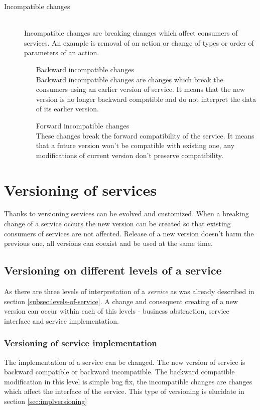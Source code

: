 \begin{description}
  \item[Incompatible changes] \hfill \\
  Incompatible changes are breaking changes which affect consumers of services. An example is removal of an action or change of types or order of parameters of an action.
  \begin{enumerate} 
    \item[Backward incompatible changes]  \hfill \\
    Backward incompatible changes are changes which break the consumers using an earlier version of service. It means that the new version is no longer backward compatible and do not interpret the data of its earlier version.
    \item[Forward incompatible changes] \hfill \\
    These changes break the forward compatibility of the service. It means that a future version won't be compatible with existing one, any modifications of current version don't preserve compatibility.
  \end{enumerate}
\end{description}

\section{Versioning of services}
\label{sec:verioningservices}
Thanks to versioning services can be evolved and customized. When a breaking change of a service occurs the new version can be created so that existing consumers of services are not affected. Release of a new version doesn't harm the previous one, all versions can coexist and be used at the same time. 

\subsection{Versioning on different levels of a service}
As there are three levels of interpretation of a \emph{service} as was already described in section \ref{subsec:levels-of-service}. A change and consequent creating of a new version can occur within each of this levels - business abstraction, service interface and service implementation.

\subsubsection{\textbf{Versioning of service implementation}}
The implementation of a service can be changed. The new version of service is backward compatible or backward incompatible. The backward compatible modification in this level is simple bug fix, the incompatible changes are changes which affect the interface of the service. This type of versioning is elucidate in section \ref{sec:implversioning}


